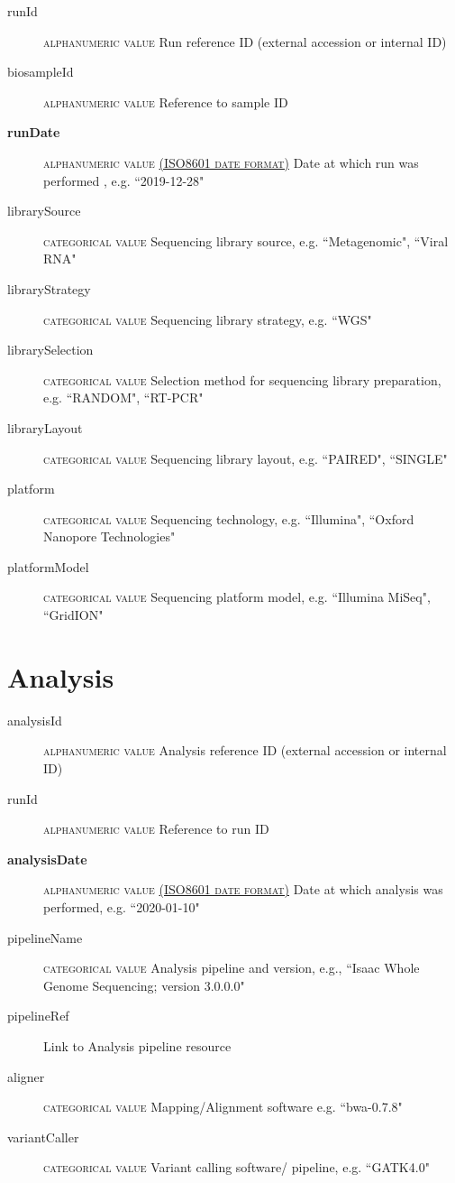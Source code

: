 \documentclass[a4paper, 10pt]{article}        %
\begin{document}
  \begin{description}
	\item[runId] {\textsc{alphanumeric value}} Run reference ID (external accession or internal ID)
	\item[biosampleId] {\textsc{alphanumeric value}}  Reference to sample ID
	\item[\textbf{runDate}] {\textsc{alphanumeric value \href{https://www.iso.org/iso-8601-date-and-time-format.html}{(ISO8601 date format)}}} Date at which run was performed	, e.g. ``2019-12-28"
	\item[librarySource] {\textsc{categorical value}}  Sequencing library source, e.g. ``Metagenomic", ``Viral RNA"
	\item[libraryStrategy]  {\textsc{categorical value}} Sequencing library strategy, e.g. ``WGS"
	\item[librarySelection] {\textsc{categorical value}} Selection method for sequencing library preparation, e.g. ``RANDOM", ``RT-PCR"
	\item[libraryLayout] {\textsc{categorical value}}  Sequencing library layout, e.g. ``PAIRED", ``SINGLE"
	\item[platform] {\textsc{categorical value}} Sequencing technology, e.g. ``Illumina", ``Oxford Nanopore Technologies"
	\item[platformModel] {\textsc{categorical value}} Sequencing platform model, e.g. ``Illumina MiSeq", ``GridION"
 \end{description}
 
 
 
   \section*{ {\color{teal} Analysis}}
  
  \begin{description}
	\item[analysisId] {\textsc{alphanumeric value}} Analysis reference ID (external accession or internal ID)
	\item[runId] {\textsc{alphanumeric value}} Reference to run ID
	\item[\textbf{analysisDate}] {\textsc{alphanumeric value \href{https://www.iso.org/iso-8601-date-and-time-format.html}{(ISO8601 date format)}}} Date at which analysis was performed, e.g. ``2020-01-10"
	\item[pipelineName]  {\textsc{categorical value}} Analysis pipeline and version, e.g., ``Isaac Whole Genome Sequencing; version 3.0.0.0"
	\item[pipelineRef]  Link to Analysis pipeline resource
	\item[aligner]  {\textsc{categorical value}} Mapping/Alignment software e.g. ``bwa-0.7.8"
	  \item[variantCaller]  {\textsc{categorical value}} Variant calling software/ pipeline, e.g. ``GATK4.0" %
 \end{description}
 
\end{document}
